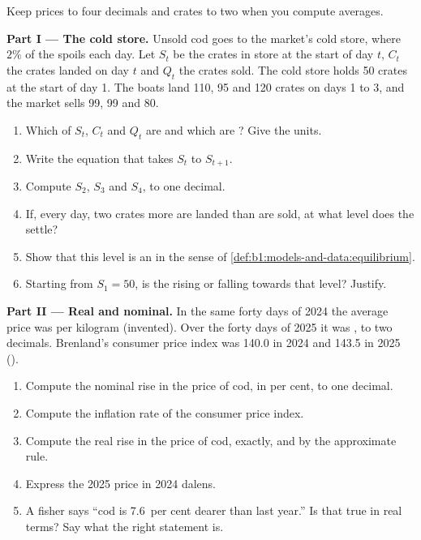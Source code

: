 \begin{problem}
Keep prices to four decimals and crates to two when you compute averages.

\medskip\noindent\textbf{Part I --- The cold store.}
Unsold cod goes to the market's cold store, where $2\%$ of the  spoils
each day. Let $S_t$ be the crates in store at the start of day $t$, $C_t$
the crates landed on day $t$ and $Q_t$ the crates sold. The cold store
holds 50 crates at the start of day 1. The boats land 110, 95 and 120 crates
on days 1 to 3, and the market sells 99, 99 and 80.
\begin{enumerate}
  \item Which of $S_t$, $C_t$ and $Q_t$ are  and which are ? Give the units.
  \item Write the equation that takes $S_t$ to $S_{t+1}$.
  \item Compute $S_2$, $S_3$ and $S_4$, to one decimal.
  \item If, every day, two crates more are landed than are sold, at what level does the  settle?
  \item Show that this level is an  in the sense of \cref{def:b1:models-and-data:equilibrium}.
  \item Starting from $S_1 = 50$, is the  rising or falling towards that level? Justify.
\end{enumerate}

\medskip\noindent\textbf{Part II --- Real and nominal.}
In the same forty days of 2024 the average price was  per
kilogram (invented). Over the forty days of 2025 it was , to two
decimals. Brenland's consumer price index was 140.0 in 2024 and 143.5 in
2025 ().
\begin{enumerate}[resume]
  \item Compute the nominal rise in the price of cod, in per cent, to one decimal.
  \item Compute the inflation rate of the consumer price index.
  \item Compute the real rise in the price of cod, exactly, and by the approximate rule.
  \item Express the 2025 price in 2024 dalens.
  \item A fisher says ``cod is 7.6~per cent dearer than last year.'' Is that true in real terms? Say what the right statement is.
\end{enumerate}


\end{problem}
